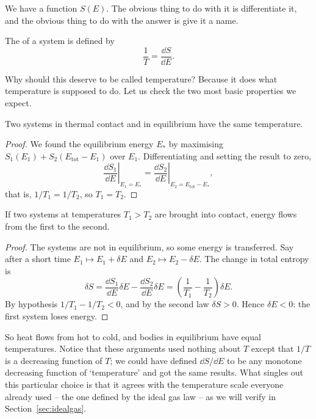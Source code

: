 We have a function $S(E)$. The obvious thing to do with it is differentiate it, and the obvious thing to do with the answer is give it a name.

\begin{definition}[Temperature]
	The  of a system is defined by
	$$
	\frac{1}{T} = \frac{\dd S}{\dd E}.
	$$
\end{definition}

Why should this deserve to be called temperature? Because it does what temperature is supposed to do. Let us check the two most basic properties we expect.

\begin{proposition}
	Two systems in thermal contact and in equilibrium have the same temperature.
\end{proposition}
\begin{proof}
	We found the equilibrium energy $E_*$ by maximising $S_1(E_1) + S_2(E_{\mathrm{tot}} - E_1)$ over $E_1$. Differentiating and setting the result to zero,
	$$
	\left.\frac{\dd S_1}{\dd E}\right|_{E_1 = E_*} = \left.\frac{\dd S_2}{\dd E}\right|_{E_2 = E_{\mathrm{tot}} - E_*},
	$$
	that is, $1/T_1 = 1/T_2$, so $T_1 = T_2$.
\end{proof}

\begin{proposition}
	If two systems at temperatures $T_1 > T_2$ are brought into contact, energy flows from the first to the second.
\end{proposition}
\begin{proof}
	The systems are not in equilibrium, so some energy is transferred. Say after a short time $E_1 \mapsto E_1 + \delta E$ and $E_2 \mapsto E_2 - \delta E$. The change in total entropy is
	$$
	\delta S = \frac{\dd S_1}{\dd E}\delta E - \frac{\dd S_2}{\dd E}\delta E = \left(\frac{1}{T_1} - \frac{1}{T_2}\right)\delta E.
	$$
	By hypothesis $1/T_1 - 1/T_2 < 0$, and by the second law $\delta S > 0$. Hence $\delta E < 0$: the first system loses energy.
\end{proof}

So heat flows from hot to cold, and bodies in equilibrium have equal temperatures. Notice that these arguments used nothing about $T$ except that $1/T$ is a decreasing function of $T$; we could have defined $\dd S/\dd E$ to be any monotone decreasing function of `temperature' and got the same results. What singles out this particular choice is that it agrees with the temperature scale everyone already used -- the one defined by the ideal gas law -- as we will verify in Section~\ref{sec:idealgas}.

